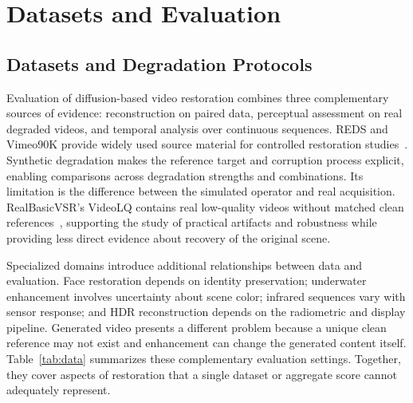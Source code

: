 \section{Datasets and Evaluation}
\label{sec:evaluation}
\subsection{Datasets and Degradation Protocols}
Evaluation of diffusion-based video restoration combines three complementary sources of evidence: reconstruction on paired data, perceptual assessment on real degraded videos, and temporal analysis over continuous sequences. REDS and Vimeo90K provide widely used source material for controlled restoration studies~\cite{reds,vimeo90k}. Synthetic degradation makes the reference target and corruption process explicit, enabling comparisons across degradation strengths and combinations. Its limitation is the difference between the simulated operator and real acquisition. RealBasicVSR's VideoLQ contains real low-quality videos without matched clean references~\cite{realbasicvsr}, supporting the study of practical artifacts and robustness while providing less direct evidence about recovery of the original scene.

Specialized domains introduce additional relationships between data and evaluation. Face restoration depends on identity preservation; underwater enhancement involves uncertainty about scene color; infrared sequences vary with sensor response; and HDR reconstruction depends on the radiometric and display pipeline. Generated video presents a different problem because a unique clean reference may not exist and enhancement can change the generated content itself. Table~\ref{tab:data} summarizes these complementary evaluation settings. Together, they cover aspects of restoration that a single dataset or aggregate score cannot adequately represent.

